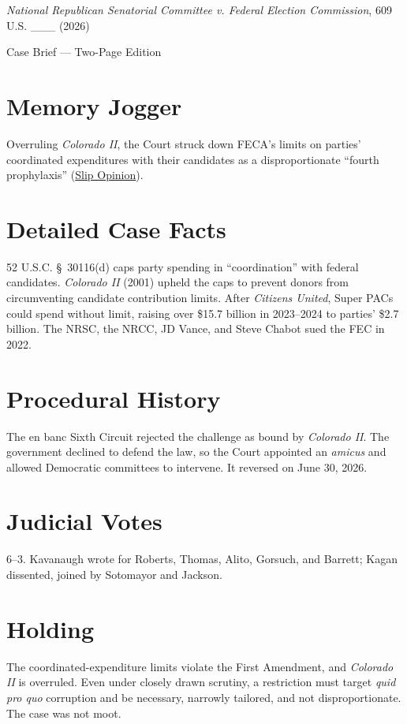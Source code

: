 \documentclass[12pt]{article}
\begin{document}
\begin{center}
{\LARGE \textit{National Republican Senatorial Committee v. Federal Election Commission}, 609 U.S. \_\_\_ (2026)\par}
\vspace{0.5em}
{\large Case Brief --- Two-Page Edition\par}
\end{center}

\section{Memory Jogger}
Overruling \textit{Colorado II}, the Court struck down FECA's limits on parties' coordinated expenditures with their candidates as a disproportionate ``fourth prophylaxis'' (\href{https://www.supremecourt.gov/opinions/25pdf/24-621_h315.pdf}{Slip Opinion}).

\section{Detailed Case Facts}
52 U.S.C. \S~30116(d) caps party spending in ``coordination'' with federal candidates. \textit{Colorado II} (2001) upheld the caps to prevent donors from circumventing candidate contribution limits. After \textit{Citizens United}, Super PACs could spend without limit, raising over \$15.7 billion in 2023--2024 to parties' \$2.7 billion. The NRSC, the NRCC, JD Vance, and Steve Chabot sued the FEC in 2022.

\section{Procedural History}
The en banc Sixth Circuit rejected the challenge as bound by \textit{Colorado II}. The government declined to defend the law, so the Court appointed an \textit{amicus} and allowed Democratic committees to intervene. It reversed on June 30, 2026.

\section{Judicial Votes}
6--3. Kavanaugh wrote for Roberts, Thomas, Alito, Gorsuch, and Barrett; Kagan dissented, joined by Sotomayor and Jackson.

\section{Holding}
The coordinated-expenditure limits violate the First Amendment, and \textit{Colorado II} is overruled. Even under closely drawn scrutiny, a restriction must target \textit{quid pro quo} corruption and be necessary, narrowly tailored, and not disproportionate. The case was not moot.
\end{document}
